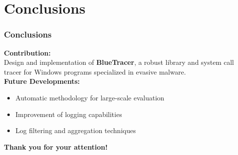 \documentclass[compress]{beamer}
\begin{document}
\begin{frame}[fragile]


\end{frame}

\section{Conclusions}

\begin{frame}
    \frametitle{Conclusions}
	
	\textbf{\textcolor{sapienza}{Contribution:}} \\
	\smallskip	
	\tab Design and implementation of \textbf{BlueTracer},
a robust library and \tab system call tracer for Windows programs specialized in evasive
\tab malware.
	\\\bigskip
	\textbf{\textcolor{sapienza}{Future Developments:}} \\
	\begin{itemize}
	\item Automatic methodology for large-scale evaluation 
	\item Improvement of logging capabilities
	\item Log filtering and aggregation techniques
	\end{itemize}

\end{frame}

\begin{frame}
\begin{center}
{\fontsize{15}{15}\selectfont \textbf{Thank you for your attention!}}
\end{center}
\end{frame}
\end{document}

